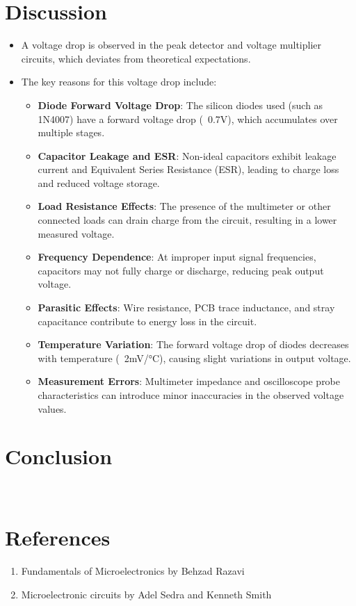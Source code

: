 \documentclass[9pt,conference]{IEEEtran}
\begin{document}
\section{Discussion}
\begin{itemize}
    \item A voltage drop is observed in the peak detector and voltage multiplier circuits, which deviates from theoretical expectations.
    \item The key reasons for this voltage drop include:
    \begin{itemize}
        \item \textbf{Diode Forward Voltage Drop}: The silicon diodes used (such as 1N4007) have a forward voltage drop (~0.7V), which accumulates over multiple stages.
        \item \textbf{Capacitor Leakage and ESR}: Non-ideal capacitors exhibit leakage current and Equivalent Series Resistance (ESR), leading to charge loss and reduced voltage storage.
        \item \textbf{Load Resistance Effects}: The presence of the multimeter or other connected loads can drain charge from the circuit, resulting in a lower measured voltage.
        \item \textbf{Frequency Dependence}: At improper input signal frequencies, capacitors may not fully charge or discharge, reducing peak output voltage.
        \item \textbf{Parasitic Effects}: Wire resistance, PCB trace inductance, and stray capacitance contribute to energy loss in the circuit.
        \item \textbf{Temperature Variation}: The forward voltage drop of diodes decreases with temperature (~2mV/°C), causing slight variations in output voltage.
        \item \textbf{Measurement Errors}: Multimeter impedance and oscilloscope probe characteristics can introduce minor inaccuracies in the observed voltage values.
    \end{itemize}
\end{itemize}


\section{Conclusion}
\\

\section{References}
\begin{enumerate}
    \item Fundamentals of Microelectronics by Behzad Razavi
    \item Microelectronic circuits by Adel Sedra and Kenneth Smith
\end{enumerate}
\end{document}
